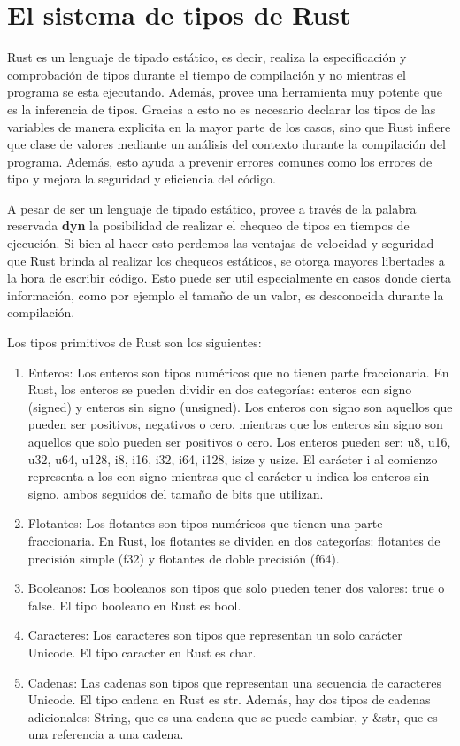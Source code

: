 \chapter{El sistema de tipos de Rust}

Rust es un lenguaje de tipado estático, es decir, realiza la especificación y comprobación de tipos durante el tiempo de compilación y no mientras el programa se esta ejecutando. Además, provee una herramienta muy potente que es la inferencia de tipos. Gracias a esto no es necesario declarar los tipos de las variables de manera explicita en la mayor parte de los casos, sino que Rust infiere que clase de valores mediante un análisis del contexto durante la compilación del programa. Además, esto ayuda a prevenir errores comunes como los errores de tipo y mejora la seguridad y eficiencia del código.

A pesar de ser un lenguaje de tipado estático, provee a través de la palabra reservada \textbf{dyn} la posibilidad de realizar el chequeo de tipos en tiempos de ejecución. Si bien al hacer esto perdemos las ventajas de velocidad y seguridad que Rust brinda al realizar los chequeos estáticos, se otorga mayores libertades a la hora de escribir código. Esto puede ser util especialmente en casos donde cierta información, como por ejemplo el tamaño de un valor, es desconocida durante la compilación.

Los tipos primitivos de Rust son los siguientes:
\begin{enumerate}
    \item Enteros: Los enteros son tipos numéricos que no tienen parte fraccionaria. En Rust, los enteros se pueden dividir en dos categorías: enteros con signo (signed) y enteros sin signo (unsigned). Los enteros con signo son aquellos que pueden ser positivos, negativos o cero, mientras que los enteros sin signo son aquellos que solo pueden ser positivos o cero. Los enteros pueden ser: u8, u16, u32, u64, u128, i8, i16, i32, i64, i128, isize y usize. El carácter i al comienzo representa a los con signo mientras que el carácter u indica los enteros sin signo, ambos seguidos del tamaño de bits que utilizan.
    \item  Flotantes: Los flotantes son tipos numéricos que tienen una parte fraccionaria. En Rust, los flotantes se dividen en dos categorías: flotantes de precisión simple (f32) y flotantes de doble precisión (f64).
    \item  Booleanos: Los booleanos son tipos que solo pueden tener dos valores: true o false. El tipo booleano en Rust es bool.
    \item  Caracteres: Los caracteres son tipos que representan un solo carácter Unicode. El tipo caracter en Rust es char.
    \item Cadenas: Las cadenas son tipos que representan una secuencia de caracteres Unicode. El tipo cadena en Rust es str. Además, hay dos tipos de cadenas adicionales: String, que es una cadena que se puede cambiar, y \&str, que es una referencia a una cadena.
\end{enumerate}

